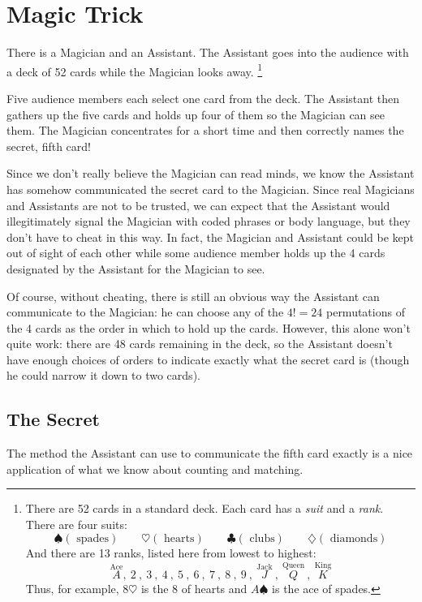 \section{Magic Trick}

There is a Magician and an Assistant.  The Assistant goes into the
audience with a deck of 52 cards while the Magician looks away.%
\footnote{ There are 52 cards in a standard deck.  Each card has a
  \emph{suit} and a \emph{rank}.  There are four suits:
%
\[
\spadesuit (\text{ spades}) \qquad
\heartsuit (\text{ hearts}) \qquad
\clubsuit (\text{ clubs}) \qquad
\diamondsuit (\text{ diamonds})
\]
%
And there are 13 ranks, listed here from lowest to highest:
%
\[
\stackrel{\text{Ace}}{A},\
2\ ,\ 3\ ,\ 4\ ,\ 5\ ,\ 6\ ,\ 7\ ,\ 8\ ,\ 9\ ,\
\stackrel{\text{Jack}}{J}\ ,\
\stackrel{\text{Queen}}{Q}\ ,\
\stackrel{\text{King}}{K}
\]
%
Thus, for example, $8 \heartsuit$ is the 8 of hearts and $A
\spadesuit$ is the ace of spades.}

Five audience members each select one card from the deck.  The Assistant
then gathers up the five cards and holds up four of them so the Magician
can see them.  The Magician concentrates for a short time and then
correctly names the secret, fifth card!

Since we don't really believe the Magician can read minds, we know the
Assistant has somehow communicated the secret card to the Magician.  Since
real Magicians and Assistants are not to be trusted, we can expect that
the Assistant would illegitimately signal the Magician with coded phrases
or body language, but they don't have to cheat in this way.  In fact, the
Magician and Assistant could be kept out of sight of each other while some
audience member holds up the 4 cards designated by the Assistant for the
Magician to see.

Of course, without cheating, there is still an obvious way the Assistant
can communicate to the Magician: he can choose any of the $4! = 24$
permutations of the 4 cards as the order in which to hold up the cards.
However, this alone won't quite work: there are 48 cards remaining in the
deck, so the Assistant doesn't have enough choices of orders to indicate
exactly what the secret card is (though he could narrow it down to two
cards).

\subsection{The Secret}

The method the Assistant can use to communicate the fifth card exactly is
a nice application of what we know about counting and matching.

